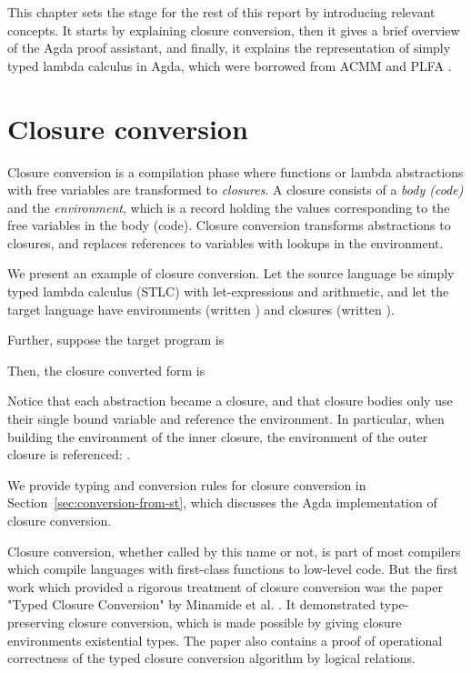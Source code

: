 \documentclass[bsc,frontabs,oneside,singlespacing,parskip,deptreport]{infthesis}
\theoremstyle{definition}
\theoremstyle{lemma}
\begin{document}
This chapter sets the stage for the rest of this report by introducing
relevant concepts. It starts by explaining closure conversion, then it
gives a brief overview of the Agda proof assistant, and finally, it
explains the representation of simply typed lambda calculus in Agda,
which were borrowed from ACMM \cite{DBLP:journals/pacmpl/AllaisA0MM18}
and PLFA \cite{DBLP:conf/sbmf/Wadler18}.

\section{Closure conversion}
\label{sec:closure-conversion}

Closure conversion is a compilation phase where functions or lambda
abstractions with free variables are transformed to
\textit{closures}. A closure consists of a \textit{body (code)} and
the \textit{environment}, which is a record holding the values
corresponding to the free variables in the body (code). Closure
conversion transforms abstractions to closures, and replaces
references to variables with lookups in the environment.

We present an example of closure conversion. Let the source language
be simply typed lambda calculus (STLC) with let-expressions and
arithmetic, and let the target language have environments (written
) and closures (written ).

Further, suppose the target program is


Then, the closure converted form is


Notice that each abstraction became a closure, and that closure bodies
only use their single bound variable and reference the environment. In
particular, when building the environment of the inner closure, the
environment of the outer closure is referenced: .

We provide typing and conversion rules for closure conversion in
Section~\ref{sec:conversion-from-st}, which discusses the Agda
implementation of closure conversion.

Closure conversion, whether called by this name or not, is part of
most compilers which compile languages with first-class functions to
low-level code. But the first work which provided a rigorous treatment
of closure conversion was the paper "Typed Closure Conversion" by
Minamide et al. \cite{TODO}. It demonstrated type-preserving closure
conversion, which is made possible by giving closure
environments existential types. The paper also contains a proof of
operational correctness of the typed closure conversion algorithm by
logical relations.
\end{document}

